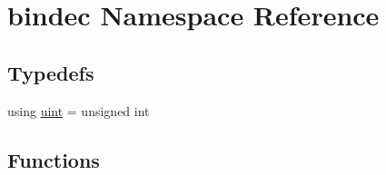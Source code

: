 \hypertarget{namespacebindec}{}\section{bindec Namespace Reference}
\label{namespacebindec}
\subsection*{Typedefs}
\begin{DoxyCompactItemize}
\item 
using \hyperlink{namespacebindec_a61700e6ffcfc677215bfdf223803e735}{uint} = unsigned int
\end{DoxyCompactItemize}
\subsection*{Functions}

